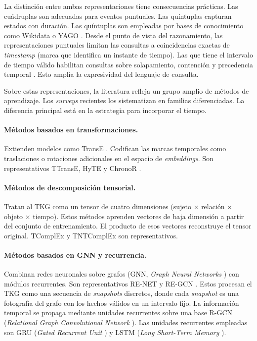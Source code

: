 La distinción entre ambas representaciones tiene consecuencias prácticas. Las cuádruplas son adecuadas para eventos puntuales. Las quíntuplas capturan estados con duración. Las quíntuplas son empleadas por bases de conocimiento como Wikidata o YAGO \cite{tkgc_survey2023}. Desde el punto de vista del razonamiento, las representaciones puntuales limitan las consultas a coincidencias exactas de \emph{timestamp} (marca que identifica un instante de tiempo). Las que tiene el intervalo de tiempo válido habilitan consultas sobre solapamiento, contención y precedencia temporal \cite{tkg_survey2024, tkgc_survey2023}. Esto amplía la expresividad del lenguaje de consulta.

Sobre estas representaciones, la literatura refleja un grupo amplio de métodos de aprendizaje. Los \emph{surveys} recientes \cite{tkg_survey2024, tkgc_survey2023} los sistematizan en familias diferenciadas. La diferencia principal está en la estrategia para incorporar el tiempo.

\paragraph{Métodos basados en transformaciones.} Extienden modelos como TransE \cite{bordes2013translating}. Codifican las marcas temporales como traslaciones o rotaciones adicionales en el espacio de \emph{embeddings}. Son representativos TTransE, HyTE y ChronoR \cite{tkg_survey2024}.

\paragraph{Métodos de descomposición tensorial.} Tratan al TKG como un tensor de cuatro dimensiones (sujeto $\times$ relación $\times$ objeto $\times$ tiempo). Estos métodos aprenden vectores de baja dimensión a partir del conjunto de entrenamiento. El producto de esos vectores reconstruye el tensor original. TComplEx \cite{tkg_survey2024} y TNTComplEx \cite{tkgc_survey2023} son representativos.

\paragraph{Métodos basados en GNN y recurrencia.} Combinan redes neuronales sobre grafos (GNN, \emph{Graph Neural Networks} \cite{gnn_placeholder}) con módulos recurrentes. Son representativos RE-NET \cite{renet_placeholder} y RE-GCN \cite{regcn_placeholder}. Estos procesan el TKG como una secuencia de \emph{snapshots} discretos, donde cada \emph{snapshot} es una fotografía del grafo con los hechos válidos en un intervalo fijo. La información temporal se propaga mediante unidades recurrentes sobre una base R-GCN (\emph{Relational Graph Convolutional Network} \cite{rgcn_placeholder}). Las unidades recurrentes empleadas son GRU (\emph{Gated Recurrent Unit} \cite{gru_placeholder}) y LSTM (\emph{Long Short-Term Memory} \cite{lstm_placeholder}).

